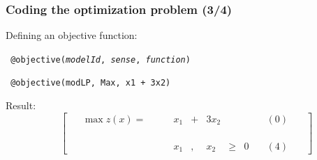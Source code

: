 \documentclass[]{beamer}
\newcommand*{\greenxg}[1]{{\color{ngreen}#1}}
\begin{document}
\begin{frame}
  \frametitle{Coding the optimization problem (3/4)}
\vspace{3mm}


\hspace{-2mm} Defining an objective function:
\vspace{1mm}
\begin{tcolorbox}[arc=1ex, colback=yellow!20, colframe=yellow!20, left=3pt, right=3pt, top=3pt, bottom=2pt]
\texttt{ \hspace{-2mm} @objective(\textit{modelId}, \textit{sense}, \textit{function})}
\end{tcolorbox}
\begin{tcolorbox}[arc=1ex, colback=black!20, colframe=black!20, left=3pt, right=3pt, top=3pt, bottom=2pt]
\texttt{ \hspace{-2mm}\greenxg{julia>}  @objective(modLP, Max, x1 + 3x2)}
\end{tcolorbox} 
\vspace{8mm}

\hspace{-2mm} Result:
\vspace{1mm}
{\tiny
{
$$\quad \left[ \ \begin{array}{crcrccc}
\quad  \max z(x) = \qquad & x_1 &+& 3x_2 &   &    & \quad (0)\quad \  \\
\mbox{ } \\
\mbox{ } \\
\mbox{ } \\
    &         x_1 &,&  x_2 &\ge& 0  & \quad (4)\quad \
 \end{array}\ \right]
$$
}
}


\end{frame}


% 
%
\end{document}

